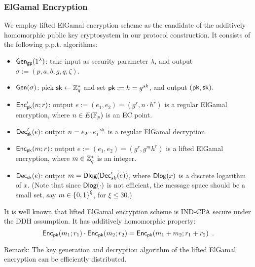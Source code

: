 \subsubsection{ElGamal Encryption} \label{sec:elgamal}
We employ lifted ElGamal encryption scheme as the candidate of the additively homomorphic public key cryptosystem in our protocol construction. It consists of the following p.p.t. algorithms:
\begin{itemize}
\item $\mathsf{Gen}_{\mathsf{gp}}(1^\lambda)$: take input as security parameter $\lambda$, and output $\sigma:=(p,a,b,g,q,\zeta)$.
\item $\mathsf{Gen}(\sigma)$: pick $\mathsf{sk}\leftarrow \mathbb{Z}_q^*$ and set $\mathsf{pk}:=h=g^{sk}$, and output $(\mathsf{pk},\mathsf{sk})$. 
\item $\mathsf{Enc}'_{\mathsf{pk}}(n;r)$: output $e:=(e_1,e_2)=(g^r,n\cdot h^r)$ is a regular ElGamal encryption, where $n\in E(\mathbb{F}_p)$ is an EC point.
\item $\mathsf{Dec}'_{\mathsf{sk}}(e)$: output $n=e_2\cdot e_1^{-\mathsf{sk}}$ is a regular ElGamal decryption.
\item $\mathsf{Enc}_{\mathsf{pk}}(m;r)$: output $e:=(e_1,e_2)=(g^r,g^m h^r)$ is a lifted ElGamal encryption, where $m\in \mathbb{Z}_q^*$ is an integer.
\item $\mathsf{Dec}_{\mathsf{sk}}(e)$: output $m=\mathsf{Dlog}(\mathsf{Dec}'_{sk}(e))$, where $\mathsf{Dlog}(x)$ is a discrete logarithm of $x$. (Note that since $\mathsf{Dlog}(\cdot)$ is not efficient, the message space should be a small set, say $m\in \left\{0,1\right\}^\xi$, for $\xi\leq30$.)
\end{itemize}

It is well known that lifted ElGamal encryption scheme is IND-CPA secure under the DDH assumption. It has additively homomorphic property: $$\mathsf{Enc}_{\mathsf{pk}}(m_1;r_1) \cdot \mathsf{Enc}_{\mathsf{pk}}(m_2;r_2) = \mathsf{Enc}_{\mathsf{pk}}(m_1 + m_2 ;r_1+ r_2 )\enspace.$$

Remark: The key generation and decryption algorithm of the lifted ElGamal encryption can be efficiently distributed.

